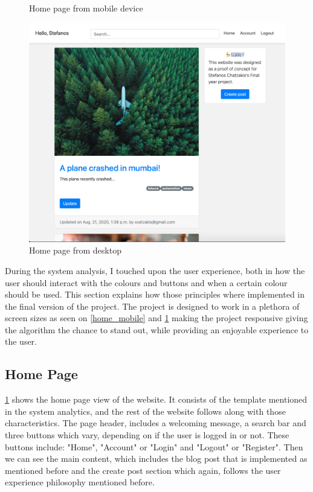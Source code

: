 \begin{figure}[htbp]
\begin{minipage}[t]{0.45\linewidth}
    \caption{Home page from mobile device}
    \label{home_mobile}
\end{minipage}%
    \hfill%
\begin{minipage}[t]{0.45\linewidth}
    \includegraphics[width=\linewidth]{Figures/home_pc}
    \caption{Home page from desktop}
    \label{home_pc}
\end{minipage}
\end{figure}

During the system analysis, I touched upon the user experience, both in how the user should interact with the colours and buttons and when a certain colour should be used. This section explains how those principles where implemented in the final version of the project. The project is designed to work in a plethora of screen sizes as seen on \ref{home_mobile} and \ref{home_pc} making the project responsive giving the algorithm the chance to stand out, while providing an enjoyable experience to the user.

\subsection{Home Page}

\ref{home_pc} shows the home page view of the website. It consists of the template mentioned in the system analytics, and the rest of the website follows along with those characteristics. The page header, includes a welcoming message, a search bar and three buttons which vary, depending on if the user is logged in or not. These buttons include: "Home", "Account" or "Login" and "Logout" or "Register". Then we can see the main content, which includes the blog post that is implemented as mentioned before and the create post section which again, follows the user experience philosophy mentioned before.

